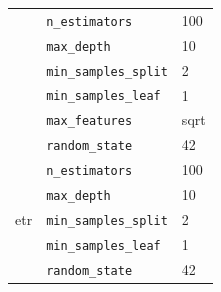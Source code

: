 \begin{table}[!htb]
\begin{tabular}{@{}llp{}@{}}
& \texttt{n\_estimators} & 100 \\
& \texttt{max\_depth} & 10 \\
& \texttt{min\_samples\_split} & 2 \\
& \texttt{min\_samples\_leaf} & 1 \\
& \texttt{max\_features} & sqrt \\
& \texttt{random\_state} & 42 \\
\midrule
\multirow{5}{*}{\gls{etr}}
& \texttt{n\_estimators} & 100 \\
& \texttt{max\_depth} & 10 \\
& \texttt{min\_samples\_split} & 2 \\
& \texttt{min\_samples\_leaf} & 1 \\
& \texttt{random\_state} & 42 \\
\midrule
\end{tabular}
\label{tab:combined_hyperparameters}
\end{table}

\FloatBarrier

